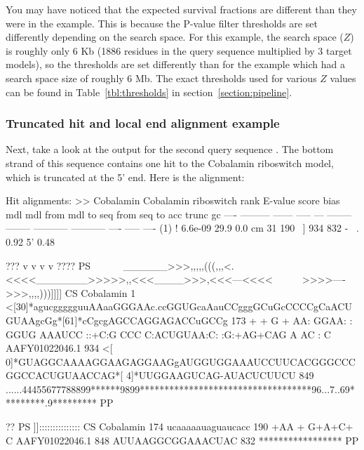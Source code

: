 You may have noticed that the expected survival fractions are
different than they were in the  example. This is
because the P-value filter thresholds are set differently depending on
the search space. For this example, the search space ($Z$) is roughly
only 6 Kb (1886 residues in the query sequence multiplied by 3 target
models), so the thresholds are set differently than for the
 example which had a search space size of roughly 6
Mb. The exact thresholds used for various $Z$ values can be found in
Table~\ref{tbl:thresholds} in section~\ref{section:pipeline}.

\subsubsection{Truncated hit and local end alignment example}
Next, take a look at the  output for the second query
sequence . The bottom strand of this sequence
contains one hit to the Cobalamin riboswitch model, which is truncated
at the 5' end. Here is the alignment:

\begin{widesreoutput}
Hit alignments:
>> Cobalamin  Cobalamin riboswitch
 rank     E-value  score  bias mdl mdl from   mdl to       seq from      seq to       acc trunc   gc
 ----   --------- ------ ----- --- -------- --------    ----------- -----------      ---- ----- ----
  (1) !   6.6e-09   29.9   0.0  cm       31      190 ~]         934         832 - ~. 0.92    5' 0.48

                                 ???              v           v      v    v                                     ???? PS
                     ~~~~~~______>>>,,,,,(((,,,<.<<<<_______>>>>>,,<<<____>>>,<<<---<<<<~~~~~~>>>>---->>>,,,,)))]]]] CS
       Cobalamin   1 <[30]*agucggggguuAAaaGGGAAc.ccGGUGcaAauCCgggGCuGcCCCCgCaACUGUAAgcGg*[61]*cCgcgAGCCAGGAGACCuGCCg 173
                           + + G     + AA: GGAA: : GGUG AAAUCC ::+C:G CCC  C:ACUGUAA:C:        :G:+AG+CAG A AC :  C 
  AAFY01022046.1 934 <[ 0]*GUAGGCAAAAGGAAGAGGAAGgAUGGUGGAAAUCCUUCACGGGCCCGGCCACUGUAACCAG*[ 4]*UUGGAAGUCAG-AUACUCUUCU 849
                     ......44455677788899******9899***********************************96...7..69*********.9********* PP

                     ??                PS
                     ]]::::::::::::::: CS
       Cobalamin 174 ucaaaaauaguaucacc 190
                       +AA +  G+A+C+ C
  AAFY01022046.1 848 AUUAAGGCGGAAACUAC 832
                     ***************** PP
\end{widesreoutput}

